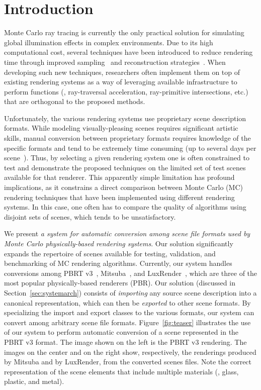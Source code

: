 \section{Introduction}
\label{sec:introduction}

Monte Carlo ray tracing is currently the only practical solution for simulating global illumination effects in complex environments.
Due to its high computational cost, several techniques have been introduced to reduce rendering time through improved sampling~\cite{Heck2013, Pilleboue:2015} and reconstruction strategies~\cite{Sen2012, Rousselle2013, Kalantari2015, Bitterli2016}. When developing such new techniques, researchers often implement them on top of existing rendering systems as a way of leveraging available infrastructure to perform functions (\eg, ray-traversal acceleration, ray-primitive intersections, etc.) that are orthogonal to the proposed methods.

Unfortunately, the various rendering systems use proprietary scene description formats. While modeling visually-pleasing scenes requires significant artistic skills, manual conversion between proprietary formats requires knowledge of the specific formats and tend to be extremely time consuming (up to several days per scene~\cite{tungsten}). 
Thus, by selecting a given rendering system one is often constrained to test and demonstrate the proposed techniques on the limited set of test scenes available for that renderer. This apparently simple limitation has profound implications, as it constrains a direct comparison between Monte Carlo (MC) rendering techniques that have been implemented using different rendering systems. In this case, one often has to compare the quality of algorithms using disjoint sets of scenes, which tends to be unsatisfactory.    
    
We present {\it a system for automatic conversion among scene file formats used by Monte Carlo physically-based rendering systems}. 
Our solution significantly expands the repertoire of scenes available for testing, validation, and benchmarking of MC rendering algorithms.  
Currently, our system handles conversions among PBRT v3~\cite{PBRT:v3}, Mitsuba~\cite{mitsuba}, and LuxRender~\cite{luxrender}, which are three of the most popular physically-based renderers (PBR). Our solution (discussed in Section~\ref{sec:systemarch}) consists of {\it importing} any source scene description into a canonical representation, which can then be {\it exported} to other scene formats. By specializing the import and export classes to the various formats, our system can convert among arbitrary scene file formats.     
%
Figure~\ref{fig:teaser} illustrates the use of our system to perform automatic conversion of a scene represented in the PBRT v3 format. The image shown on the left is the PBRT v3 rendering. The images on the center and on the right show, respectively, the renderings produced by Mitsuba and by LuxRender, from the converted scenes files. Note the correct representation of the scene elements that include multiple materials (\eg, glass, plastic, and metal).

